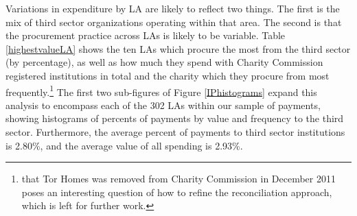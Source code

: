 \documentclass[11pt]{article}
\begin{document}
Variations in expenditure by LA are likely to reflect two things. The first is the mix of third sector organizations operating within that area. The second is that the procurement practice across LAs is likely to be variable. Table \ref{highestvalueLA} shows the ten LAs which procure the  most from the third sector (by percentage), as well as how much they spend with Charity Commission registered institutions in total and the charity which they procure from most frequently.\footnote{that Tor Homes was removed from Charity Commission in December 2011 poses an interesting question of how to refine the reconciliation approach, which is left for further work.} The first two sub-figures of Figure \ref{IPhistograms} expand this analysis to encompass each of the 302 LAs within our sample of payments, showing histograms of percents of payments by value and frequency to the third sector. Furthermore, the average percent of payments to third sector institutions is 2.80\%, and the average value of all spending is 2.93\%.
\end{document}
